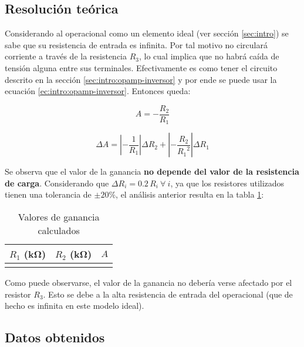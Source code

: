 \subsection{Resolución teórica}

Considerando al operacional como un elemento ideal (ver sección \ref{sec:intro}) se sabe que su resistencia de entrada es infinita. Por tal motivo no circulará corriente a través de la resistencia $R_3$, lo cual implica que no habrá caída de tensión alguna entre sus terminales. Efectivamente es como tener el circuito descrito en la sección \ref{sec:intro:opamp-inversor} y por ende se puede usar la ecuación \ref{ec:intro:opamp-inversor}. Entonces queda:

\begin{equation}
    \label{ec:1-teoria:ganancia}
    A = -\frac{R_2}{R_1}
\end{equation}

\begin{equation}
    \label{ec:1-teoria:err-ganancia}
    \Delta A = \left| - \frac{1}{R_1} \right| \Delta R_2
             + \left| - \frac{R_2}{{R_1}^2} \right| \Delta R_1
\end{equation}

Se observa que el valor de la ganancia \textbf{no depende del valor de la resistencia de carga}. Considerando que $\Delta R_i = 0.2\,R_i\ \forall\ i$, ya que los resistores utilizados tienen una tolerancia de $\pm 20\%$, el análisis anterior resulta en la tabla \ref{tab:1-teoria:valores}:

\begin{table}[H]
    \centering
    \begin{tabular}{@{}rrr@{}}
        \toprule
        $R_1$ (\si{\kilo\ohm}) & $R_2$ (\si{\kilo\ohm}) & $A$ \\
        \midrule
         \\ \bottomrule
    \end{tabular}
    \caption{Valores de ganancia calculados}
    \label{tab:1-teoria:valores}
\end{table}

Como puede observarse, el valor de la ganancia no debería verse afectado por el resistor $R_3$. Esto se debe a la alta resistencia de entrada del operacional (que de hecho es infinita en este modelo ideal).


\subsection{Datos obtenidos}

